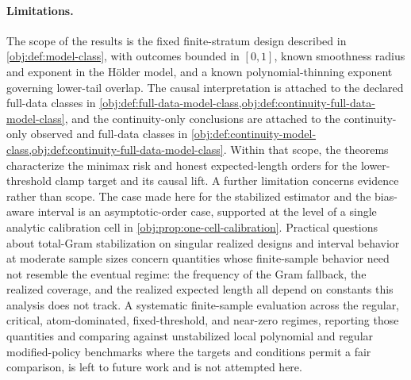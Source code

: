 \documentclass[11pt]{article}
\begin{document}
\paragraph{Limitations.}
The scope of the results is the fixed finite-stratum design described in \cref{obj:def:model-class}, with outcomes bounded in \([0,1]\), known smoothness radius and exponent in the Hölder model, and a known polynomial-thinning exponent governing lower-tail overlap. The causal interpretation is attached to the declared full-data classes in \cref{obj:def:full-data-model-class,obj:def:continuity-full-data-model-class}, and the continuity-only conclusions are attached to the continuity-only observed and full-data classes in \cref{obj:def:continuity-model-class,obj:def:continuity-full-data-model-class}. Within that scope, the theorems characterize the minimax risk and honest expected-length orders for the lower-threshold clamp target and its causal lift. A further limitation concerns evidence rather than scope. The case made here for the stabilized estimator and the bias-aware interval is an asymptotic-order case, supported at the level of a single analytic calibration cell in \cref{obj:prop:one-cell-calibration}. Practical questions about total-Gram stabilization on singular realized designs and interval behavior at moderate sample sizes concern quantities whose finite-sample behavior need not resemble the eventual regime: the frequency of the Gram fallback, the realized coverage, and the realized expected length all depend on constants this analysis does not track. A systematic finite-sample evaluation across the regular, critical, atom-dominated, fixed-threshold, and near-zero regimes, reporting those quantities and comparing against unstabilized local polynomial and regular modified-policy benchmarks where the targets and conditions permit a fair comparison, is left to future work and is not attempted here.
\end{document}
